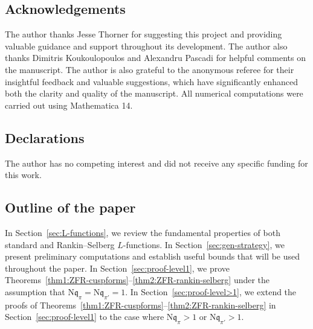 \documentclass[12pt,reqno]{amsart}
\renewcommand{\tilde}{\widetilde}
\newtheorem{thm}{Theorem}[section]
\theoremstyle{remark}
\renewcommand{\tilde}{\widetilde}
\renewcommand{\tilde}{\widetilde}
\newcommand{\N}{\mathrm{N}}
\newcommand{\kq}{\mathfrak{q}}
\numberwithin{equation}{section}
\begin{document}
	
	\subsection*{Acknowledgements} 
    The author thanks Jesse Thorner for suggesting this project and providing valuable guidance and support throughout its development. The author also thanks Dimitris Koukoulopoulos and Alexandru Pascadi for helpful comments on the manuscript. The author is also grateful to the anonymous referee for their insightful feedback and valuable suggestions, which have significantly enhanced both the clarity and quality of the manuscript. All numerical computations were carried out using Mathematica 14.

    \subsection*{Declarations}

    The author has no competing interest and did not receive any specific funding for this work.
	
    
    \subsection*{Outline of the paper}
	In Section~\ref{sec:L-functions}, we review the fundamental properties of both standard and Rankin--Selberg $L$-functions. In Section~\ref{sec:gen-strategy}, we present preliminary computations and establish useful bounds that will be used throughout the paper. In Section~\ref{sec:proof-level1}, we prove Theorems~\ref{thm1:ZFR-cuspforms}--\ref{thm2:ZFR-rankin-selberg} under the assumption that $\N\kq_{\pi} = \N\kq_{\pi'}=1$. In Section~\ref{sec:proof-level>1}, we extend the proofs of Theorems~\ref{thm1:ZFR-cuspforms}--\ref{thm2:ZFR-rankin-selberg} in Section~\ref{sec:proof-level1} to the case where $\N\kq_{\pi}>1$ or $\N\kq_{\pi'}>1$.
\end{document}
